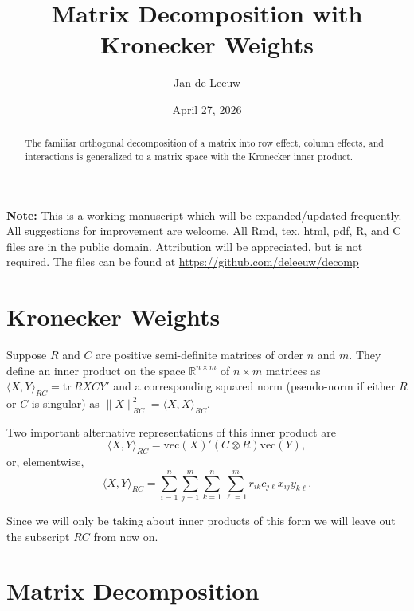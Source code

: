 \documentclass[
  12pt,
  letterpaper,
  DIV=11,
  numbers=noendperiod]{scrartcl}
\title{Matrix Decomposition with Kronecker Weights}
\author{Jan de Leeuw}
\date{April 27, 2026}
\newcommand{\sectionbreak}{\clearpage}
\renewcommand*\contentsname{Table of contents}
\newcommand\contentsname{Table of contents}
\begin{document}
\maketitle
\begin{abstract}
The familiar orthogonal decomposition of a matrix into row effect,
column effects, and interactions is generalized to a matrix space with
the Kronecker inner product.
\end{abstract}

\renewcommand*\contentsname{Table of contents}
{
\setcounter{tocdepth}{3}
\tableofcontents
}

\sectionbreak

\textbf{Note:} This is a working manuscript which will be
expanded/updated frequently. All suggestions for improvement are
welcome. All Rmd, tex, html, pdf, R, and C files are in the public
domain. Attribution will be appreciated, but is not required. The files
can be found at \url{https://github.com/deleeuw/decomp}

\sectionbreak

\section{Kronecker Weights}\label{kronecker-weights}

Suppose \(R\) and \(C\) are positive semi-definite matrices of order
\(n\) and \(m\). They define an inner product on the space
\(\mathbb{R}^{n\times m}\) of \(n\times m\) matrices as
\(\langle X, Y\rangle_{RC}=\text{tr}\ RXCY'\) and a corresponding
squared norm (pseudo-norm if either \(R\) or \(C\) is singular) as
\(\|X\|_{RC}^2=\langle X, X\rangle_{RC}\).

Two important alternative representations of this inner product are
\begin{equation}
\langle X,Y\rangle_{RC} = \text{vec}(X)'(C\otimes R)\text{vec}(Y),
\end{equation} or, elementwise, \begin{equation}
\langle X,Y\rangle_{RC} = \sum_{i=1}^{n}\sum_{j=1}^{m}\sum_{k=1}^{n}\sum_{\ell=1}^{m} r_{ik}c_{j\ell}x_{ij}y_{k\ell}.
\end{equation}

Since we will only be taking about inner products of this form we will
leave out the subscript \(RC\) from now on.

\section{Matrix Decomposition}\label{matrix-decomposition}
\end{document}
